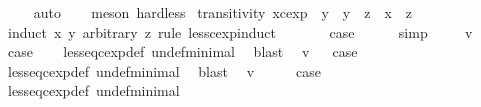 \begin{isabellebody}
\ \ \ \isamarkupfalse%
\ auto{\isacharbrackleft}{}{\isacharbrackright}\isanewline
\ \ \isamarkupfalse%
\ {\isacharparenleft}meson\ hard{\isacharunderscore}less{\isacharparenright}%
\endisatagproof
{\isafoldproof}%
%
\isadelimproof
\isanewline
%
\endisadelimproof
\isanewline
{}\isamarkupfalse%
\ transitivity{\isacharcolon}\ {\isachardoublequoteopen}{\isacharparenleft}x{\isacharcolon}{\isacharcolon}cexp{\isacharparenright}\ {\isasymle}\ y\ {\isasymLongrightarrow}\ y\ {\isasymle}\ z\ {\isasymLongrightarrow}\ x\ {\isasymle}\ z{\isachardoublequoteclose}\isanewline
%
\isadelimproof
%
\endisadelimproof
%
\isatagproof
{}\isamarkupfalse%
\ {\isacharparenleft}induct\ x\ y\ arbitrary{\isacharcolon}\ z\ rule{\isacharcolon}\ less{\isacharunderscore}cexp{\isachardot}induct{\isacharparenright}\isanewline
{}\isamarkupfalse%
\ {}\isanewline
\ \ \isamarkupfalse%
\ \isamarkupfalse%
\ {\isacharquery}case\isanewline
\ \ \ \ \isamarkupfalse%
\ simp\isanewline
{}\isamarkupfalse%
\isanewline
\ \ \isamarkupfalse%
\ {\isacharparenleft}{\isachardoublequoteopen}{}{\isacharunderscore}{}{\isachardoublequoteclose}\ v{\isacharparenright}\isanewline
{}\isamarkupfalse%
\ \isamarkupfalse%
\ {\isacharquery}case\isanewline
\ \ \isamarkupfalse%
\ less{\isacharunderscore}eq{\isacharunderscore}cexp{\isacharunderscore}def\ undef{\isacharunderscore}minimal\ \isamarkupfalse%
\ blast\isanewline
{}\isamarkupfalse%
\isanewline
{}\isamarkupfalse%
\ {\isacharparenleft}{\isachardoublequoteopen}{}{\isacharunderscore}{}{\isachardoublequoteclose}\ v{\isacharparenright}\isanewline
{}\isamarkupfalse%
\ \isamarkupfalse%
\ {\isacharquery}case\isanewline
\ \ \isamarkupfalse%
\ less{\isacharunderscore}eq{\isacharunderscore}cexp{\isacharunderscore}def\ undef{\isacharunderscore}minimal\ \isamarkupfalse%
\ blast\isanewline
{}\isamarkupfalse%
\isanewline
{}\isamarkupfalse%
\ {\isacharparenleft}{\isachardoublequoteopen}{}{\isacharunderscore}{}{\isachardoublequoteclose}\ v{\isacharparenright}\isanewline
\ \ \isamarkupfalse%
\ \isamarkupfalse%
\ {\isacharquery}case\isanewline
\ \ \isamarkupfalse%
\ less{\isacharunderscore}eq{\isacharunderscore}cexp{\isacharunderscore}def\ undef{\isacharunderscore}minimal\ \isamarkupfalse%

\end{isabellebody}
